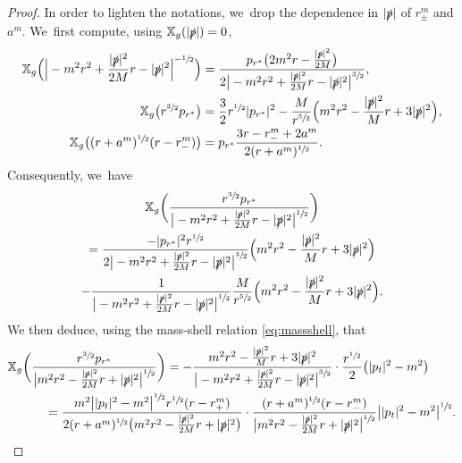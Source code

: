 \documentclass[10pt]{amsart}
\theoremstyle{plain}
\theoremstyle{definition}
\newcommand\T{{\mathbb{X}}}
\begin{document}
\begin{proof}
In order to lighten the notations, we~drop the dependence in $|\slashed{p}|$ of $r_\pm^m$ and $a^m$. We~first compute, using $\T_g(|\slashed{p}|)=0$,\vspace*{-5pt}
\begin{align*}
\T_g \Bigl(\Big| -m^2 r^2+\frac{|\slashed{p}|^2}{2M}r-|\slashed{p}|^2 \Big|^{-\sfrac{1}{2}}\Bigr) &=\frac{p_{r^*}\bigl(2m^2 r -\frac{|\slashed{p}|^2}{2M}\bigr)}{2\big|-m^2 r^2+\frac{|\slashed{p}|^2}{2M}r-|\slashed{p}|^2\big|^{\sfrac{3}{2}}}, \\
\T_g \bigl(r^{\sfrac{3}{2}}p_{r^*} \bigr) & = \frac{3}{2}r^{\sfrac{1}{2}}|p_{r^*}|^2-\frac{M}{r^{\sfrac{5}{2}}}\Bigl(m^2 r^2-\frac{|\slashed{p}|^2}{M}r+3|\slashed{p}|^2\Bigr), \\
\T_g \bigl((r+a^{m})^{\sfrac{1}{2}}(r-r_-^m) \bigr) & = p_{r^*}\frac{3r-r_-^m+2a^m}{2(r+a^{m})^{\sfrac{1}{2}}}.
\end{align*}
Consequently, we~have\vspace*{-5pt}
\begin{multline*}
\T_g \biggl(\frac{r^{\sfrac{3}{2}}p_{r^*}}{\big|-m^2 r^2+\frac{|\slashed{p}|^2}{2M}r-|\slashed{p}|^2\big|^{\sfrac{1}{2}}}\biggr) \\
=\frac{-|p_{r^*}|^2r^{\sfrac{1}{2}}}{2\big| -m^2 r^2+\frac{|\slashed{p}|^2}{2M}r-|\slashed{p}|^2 \big|^{\sfrac{3}{2}}}\Bigl(m^2 r^2-\frac{|\slashed{p}|^2}{M}r+3|\slashed{p}|^2\Bigr) \nonumber \\
-\frac{1}{\big| -m^2 r^2+\frac{|\slashed{p}|^2}{2M}r-|\slashed{p}|^2\big|^{\sfrac{1}{2}}}\frac{M}{r^{\sfrac{5}{2}}}\Bigl(m^2 r^2-\frac{|\slashed{p}|^2}{M}r+3|\slashed{p}|^2\Bigr).
\end{multline*}
We then deduce, using the mass-shell relation \eqref{eq:massshell}, that\vspace*{-3pt}
\begin{align*}
&\T_g \biggl(\frac{r^{\sfrac{3}{2}}p_{r^*}}{\big|m^2 r^2-\frac{|\slashed{p}|^2}{2M}r+|\slashed{p}|^2\big|^{\sfrac{1}{2}}}\biggr) =-\frac{m^2 r^2-\frac{|\slashed{p}|^2}{M}r+3|\slashed{p}|^2}{\big| -m^2 r^2+\frac{|\slashed{p}|^2}{2M}r-|\slashed{p}|^2\big|^{\sfrac{3}{2}}}\cdot \frac{r^{\sfrac{1}{2}}}{2} \bigl(|p_t|^2-m^2 \bigr) \\
& \qquad\quad = \frac{m^2 \big| |p_t|^2-m^2 \big|^{\sfrac{1}{2}}r^{\sfrac{1}{2}}(r-r^{m}_+)}{2(r+a^{m})^{\sfrac{1}{2}}\bigl(m^2 r^2-\frac{|\slashed{p}|^2}{2M}r+|\slashed{p}|^2\bigr)} \cdot \frac{(r+a^m)^{\sfrac{1}{2}}(r-r_-^m)}{\big| m^2 r^2-\frac{|\slashed{p}|^2}{2M}r+|\slashed{p}|^2\big|^{\sfrac{1}{2}}}\big| |p_t|^2-m^2 \big|^{\sfrac{1}{2}}.

\end{align*}
\end{proof}
\end{document}
